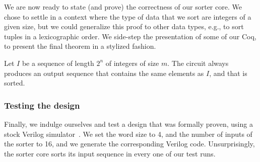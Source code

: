 \documentclass{llncs}
\begin{document}
We are now ready to state (and prove) the correctness of our sorter
core. We chose to settle in a context where the type of data that we
sort are integers of a given size, but we could generalize this proof
to other data types, e.g., to sort tuples in a lexicographic order.
We side-step the presentation of some of our Coq, to present the final
theorem in a stylized fashion.
\begin{theorem}
Let $I$ be a sequence of length $2^n$ of integers of size $m$. The
circuit always produces an output sequence that contains the same
elements as $I$, and that is sorted.
\end{theorem}




\subsubsection{Testing the design}
Finally, we indulge ourselves and test a design that was formally
proven, using a stock Verilog simulator~\cite{iverilog}. We set the
word size to 4, and the number of inputs of the sorter to 16, and we
generate the corresponding Verilog code. Unsurprisingly, the sorter
core sorts its input sequence in every one of our test runs.
\end{document}
